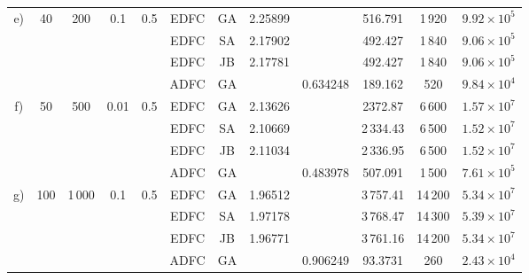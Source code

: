 \begin{tabular}{c c c c c c c c c c c c}
	\multirow{4}{*}{e)} & \multirow{4}{*}{40} & \multirow{4}{*}{200} & \multirow{4}{*}{0.1} & \multirow{4}{*}{0.5}
															 &EDFC & GA & 2.25899 &  & 516.791 & 1\,920 & $9.92 \times 10^5$ \\
	&&&& &EDFC & SA & 2.17902 &  & 492.427 & 1\,840 & $9.06 \times 10^5$ \\
	&&&& &EDFC & JB & 2.17781 &  & 492.427 & 1\,840 & $9.06 \times 10^5$ \\
	&&&& &ADFC & GA &  & 0.634248 & 189.162 & 520 & $9.84 \times 10^4$ \\ \cmidrule{2-12}
	\multirow{4}{*}{f)} & \multirow{4}{*}{50} & \multirow{4}{*}{500} & \multirow{4}{*}{0.01} & \multirow{4}{*}{0.5}
															 &EDFC & GA & 2.13626 &  & 2372.87 & 6\,600 & $1.57 \times 10^7$ \\
	&&&& &EDFC & SA & 2.10669 &  & 2\,334.43 & 6\,500 & $1.52 \times 10^7$ \\
	&&&& &EDFC & JB & 2.11034 &  & 2\,336.95 & 6\,500 & $1.52 \times 10^7$ \\
	&&&& &ADFC & GA &  & 0.483978 & 507.091 & 1\,500 & $7.61 \times 10^5$ \\ \cmidrule{2-12}
	\multirow{4}{*}{g)} & \multirow{4}{*}{100} & \multirow{4}{*}{1\,000} & \multirow{4}{*}{0.1} & \multirow{4}{*}{0.5}
															 &EDFC & GA & 1.96512 &  & 3\,757.41 & 14\,200 & $5.34 \times 10^7$ \\
	&&&& &EDFC & SA & 1.97178 &  & 3\,768.47 & 14\,300 & $5.39 \times 10^7$ \\
	&&&& &EDFC & JB & 1.96771 &  & 3\,761.16 & 14\,200 & $5.34 \times 10^7$ \\
	&&&& &ADFC & GA &  & 0.906249 & 93.3731 & 260 & $2.43 \times 10^4$ \\  \bottomrule
\end{tabular}
